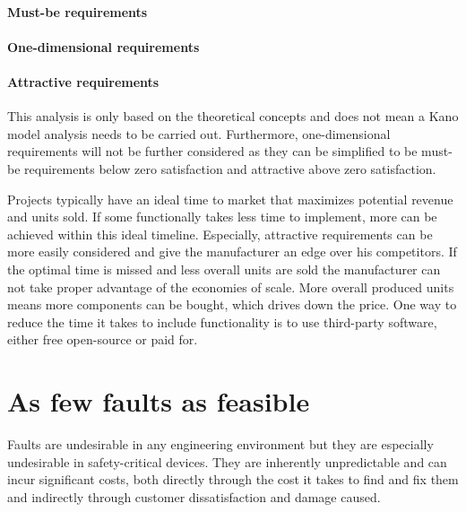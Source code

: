 \paragraph{Must-be requirements}  \autocite{ElmarSauerwein.1996}

\paragraph{One-dimensional requirements} \cite{ElmarSauerwein.1996}

\paragraph{Attractive requirements} \autocite{ElmarSauerwein.1996}

This analysis is only based on the theoretical concepts and does not mean a Kano model analysis needs to be carried out. Furthermore, one-dimensional requirements will not be further considered as they can be simplified to be must-be requirements below zero satisfaction and attractive above zero satisfaction. 

Projects typically have an ideal time to market \cite{clark1989project}\cite{stalk1988time} that maximizes potential revenue and units sold. If some functionally takes less time to implement, more can be achieved within this ideal timeline. Especially, attractive requirements can be more easily considered and give the manufacturer an edge over his competitors. If the optimal time is missed and less overall units are sold the manufacturer can not take proper advantage of the economies of scale. More overall produced units means more components can be bought, which drives down the price. One way to reduce the time it takes to include functionality is to use third-party software, either free open-source or paid for. 

\section{As few faults as feasible}
Faults are undesirable in any engineering environment but they are especially undesirable in safety-critical devices. They are inherently unpredictable and can incur significant costs, both directly through the cost it takes to find and fix them and indirectly through customer dissatisfaction and damage caused.

